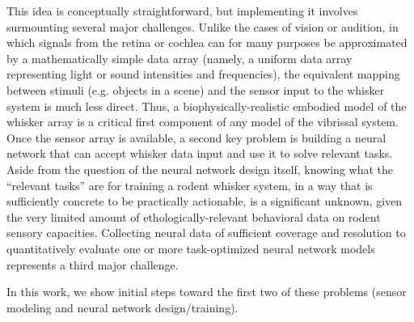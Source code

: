 This idea is conceptually straightforward, but implementing it involves surmounting several major challenges.
Unlike the cases of vision or audition, in which signals from the retina or cochlea can for many purposes be approximated by a mathematically simple data array (namely, a uniform data array representing light or sound intensities and frequencies), the equivalent mapping between stimuli (e.g. objects in a scene) and the sensor input to the whisker system is much less direct.
Thus, a biophysically-realistic embodied model of the whisker array is a critical first component of any model of the vibrissal system.
Once the sensor array is available, a second key problem is building a neural network that can accept whisker data input and use it to solve relevant tasks.
Aside from the question of the neural network design itself, knowing what the ``relevant tasks'' are for training a rodent whisker system, in a way that is sufficiently concrete to be practically actionable, is a significant unknown, given the very limited amount of ethologically-relevant behavioral data on rodent sensory capacities\cite{von2007neuronal, Knutsen2006, OConnor2010, Arabzadeh2005, Diamond2008}.
Collecting neural data of sufficient coverage and resolution to quantitatively evaluate one or more task-optimized neural network models represents a third major challenge.

In this work, we show initial steps toward the first two of these problems (sensor modeling and neural network design/training).



